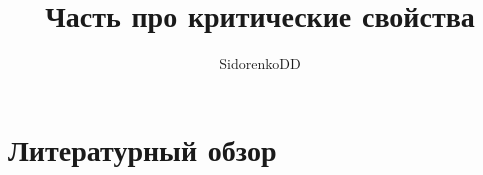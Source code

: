 \documentclass[
  letterpaper,
  DIV=11,
  numbers=noendperiod]{scrartcl}
\title{Часть про критические свойства}
\author{SidorenkoDD}
\date{}
\renewcommand*\contentsname{Table of contents}
\newcommand\contentsname{Table of contents}
\begin{document}
\maketitle

\renewcommand*\contentsname{Table of contents}
{
\hypersetup{linkcolor=}
\setcounter{tocdepth}{3}
\tableofcontents
}

\section{Литературный
обзор}\label{ux43bux438ux442ux435ux440ux430ux442ux443ux440ux43dux44bux439-ux43eux431ux437ux43eux440}
\end{document}
